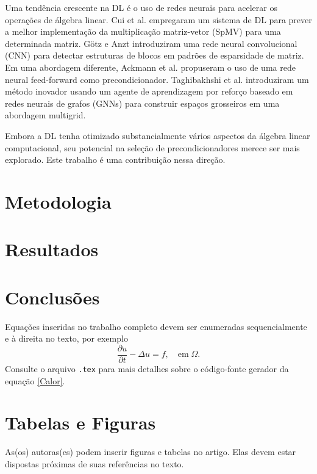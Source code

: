 \documentclass{pssbmac}
\begin{document}
Uma tendência crescente na DL é o uso de redes neurais para acelerar os 
operações de álgebra linear. Cui et al. \cite{cui2016code} empregaram um sistema de 
DL para prever a melhor implementação da multiplicação matriz-vetor (SpMV) para uma 
determinada matriz. G{\"o}tz e Anzt \cite{gotz2018machine} introduziram 
uma rede neural convolucional (CNN) para detectar estruturas de blocos em 
padrões de esparsidade de matriz. Em uma abordagem diferente, 
Ackmann et al. \cite{ackmann2020machine} propuseram o uso de uma 
rede neural feed-forward como precondicionador. Taghibakhshi et al. 
\cite{taghibakhshi2021optimization} introduziram um método inovador usando 
um agente de aprendizagem por reforço baseado em redes neurais de grafos (GNNs) 
para construir espaços grosseiros em uma abordagem multigrid. 

Embora a DL tenha otimizado substancialmente vários aspectos da álgebra linear computacional,
seu potencial na seleção de precondicionadores merece ser mais explorado. 
Este trabalho é uma contribuição nessa direção.

\section{Metodologia}\label{sec:method}
\section{Resultados}\label{sec:results}
\section{Conclusões}\label{sec:conclusions}



Equações inseridas no trabalho completo devem ser enumeradas sequencialmente e à direita no texto, por exemplo
\begin{equation}
\frac{\partial u}{\partial t}-\Delta u = f, \quad  \mathrm{em} \; \Omega. \label{Calor}
\end{equation}
Consulte o arquivo \verb!.tex! para mais detalhes sobre o código-fonte gerador da equação \eqref{Calor}.

\section{Tabelas e Figuras}

As(os) autoras(es) podem inserir figuras e tabelas no artigo. Elas devem estar dispostas próximas de suas referências no texto.
\end{document}
